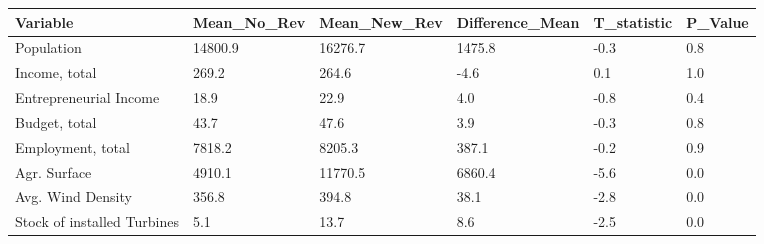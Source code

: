 \documentclass{article}
\begin{document}
\begin{table}[tbp] \centering
{}

\begin{tabularx}{\linewidth}{@{}lCCCCC@{}}

\toprule
{Variable}&{Mean\_No\_Rev}&{Mean\_New\_Rev}&{Difference\_Mean}&{T\_statistic}&{P\_Value} \tabularnewline
\midrule \addlinespace[\belowrulesep]
Population&14800.9&16276.7&1475.8&-0.3&0.8 \tabularnewline
Income, total&269.2&264.6&-4.6&0.1&1.0 \tabularnewline
Entrepreneurial Income&18.9&22.9&4.0&-0.8&0.4 \tabularnewline
Budget, total&43.7&47.6&3.9&-0.3&0.8 \tabularnewline
Employment, total&7818.2&8205.3&387.1&-0.2&0.9 \tabularnewline
Agr. Surface&4910.1&11770.5&6860.4&-5.6&0.0 \tabularnewline
Avg. Wind Density&356.8&394.8&38.1&-2.8&0.0 \tabularnewline
Stock of installed Turbines&5.1&13.7&8.6&-2.5&0.0 \tabularnewline
\bottomrule 

\end{tabularx}
\end{table}
\end{document}
